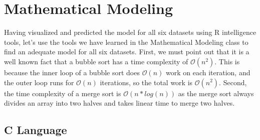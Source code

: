 \documentclass[]{report}
\begin{document}
	    \chapter{Mathematical Modeling}
	    Having visualized and predicted the model for all six datasets using R intelligence tools, let's use the tools we have learned in the Mathematical Modeling class to find an adequate model for all six datasets. First, we must point out that it is a well known fact that a bubble sort has a time complexity of $\mathcal{O}(n^2)$. This is because the inner loop of a bubble sort does $\mathcal{O}(n)$ work on each iteration, and the outer loop runs for $\mathcal{O}(n)$ iterations, so the total work is $\mathcal{O}(n^2)$. Second, the time complexity of a merge sort is $\mathcal{O}(n*log(n))$ as the merge sort always divides an array into two halves and takes linear time to merge two halves.
	    
			\section{C Language}
\end{document}

